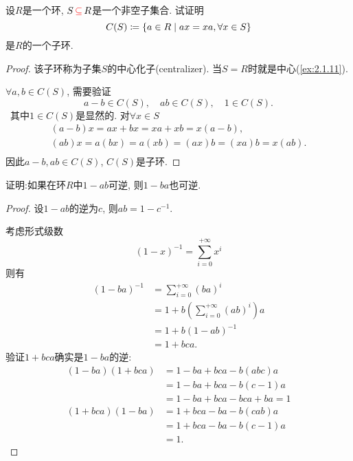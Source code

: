 \begin{problem}\label{ex:1.2.4}
    设$R$是一个环, $S \,\textcolor{red}{\subseteq}\, R$是一个非空子集合. 试证明
    \[
        C(S) \mathrel{\coloneqq} \{a \in R \mid ax = xa, \forall x \in S \}
    \]
    是$R$的一个子环.
\end{problem}

\begin{proof}
    该子环称为子集$S$的中心化子(centralizer). 当$S = R$时就是中心(\ref{ex:2.1.11}).

    $\forall a, b \in C(S)$, 需要验证
    \[
        a - b \in C(S), \quad ab \in C(S), \quad 1 \in C(S).
    \]\
    其中$1 \in C(S)$是显然的. 对$\forall x \in S$
    \[
    \begin{gathered}
        (a - b)x = ax + bx = xa + xb = x(a - b),\\
        (ab)x = a(bx) = a(xb) = (ax)b = (xa)b = x(ab).\\
    \end{gathered}
    \]
    因此$a - b, ab \in C(S)$, $C(S)$是子环.
\end{proof}

\begin{problem}\label{ex:1.2.5}
    证明:如果在环$R$中$1 - ab$可逆, 则$1 - ba$也可逆.
\end{problem}

\begin{proof}
    设$1 - ab$的逆为$c$, 则$ab = 1 - c^{-1}$.

    考虑形式级数
    \[
        (1 - x)^{-1} = \sum_{i = 0}^{+\infty} x^i
    \]
    则有
    \[
    \begin{aligned}
        (1 - ba)^{-1} &= \sum_{i = 0}^{+\infty} (ba)^i\\
        &= 1 + b\left(\sum_{i = 0}^{+\infty} (ab)^i\right)a\\
        &= 1 + b(1 - ab)^{-1}\\
        &= 1 + bca.
    \end{aligned} 
    \]
    验证$1 + bca$确实是$1 - ba$的逆: 
    \[
    \begin{aligned}
        (1 - ba)(1 + bca) &= 1 - ba + bca - b(abc)a\\
        &= 1 - ba + bca -b(c - 1)a\\
        &= 1 - ba + bca -bca + ba = 1\\
        (1 + bca)(1 - ba) &= 1 + bca - ba - b(cab)a\\
        &= 1 + bca - ba - b(c - 1)a\\
        &= 1.
    \end{aligned}
    \]
\end{proof}

